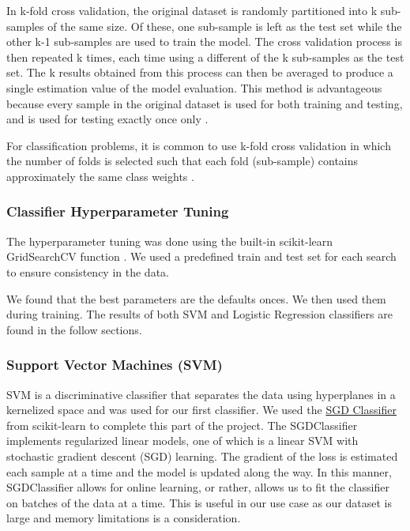 \documentclass[12pt]{article}
\begin{document}
In k-fold cross validation, the original dataset is randomly partitioned into k sub-samples of the same size. Of these, one sub-sample is left as the test set while the other k-1 sub-samples are used to train the model. The cross validation process is then repeated k times, each time using a different of the k sub-samples as the test set. The k results obtained from this process can then be averaged to produce a single estimation value of the model evaluation. This method is advantageous because every sample in the original dataset is used for both training and testing, and is used for testing exactly once only \cite{k_fold1}.

For classification problems, it is common to use k-fold cross validation in which the number of folds is selected such that each fold (sub-sample) contains approximately the same class weights \cite{k_fold2}.

\subsubsection{Classifier Hyperparameter Tuning}

The hyperparameter tuning was done using the built-in scikit-learn GridSearchCV  function \cite{sklearn}. We used a predefined train and test set for each search to ensure consistency in the data. 

We found that the best parameters are the defaults onces. We then used them during training. The results of both SVM and Logistic Regression classifiers are found in the follow sections. 

\subsubsection{Support Vector Machines (SVM)}
 
SVM is a discriminative classifier that separates the data using hyperplanes in a kernelized space and was used for our first classifier. We used the \href{https://scikit-learn.org/stable/modules/generated/sklearn.linear_model.SGDClassifier.html}{SGD Classifier} from scikit-learn \cite{sklearn} to complete this part of the project. The SGDClassifier implements regularized linear models, one of which is a linear SVM with stochastic gradient descent (SGD) learning. The gradient of the loss is estimated each sample at a time and the model is updated along the way. In this manner, SGDClassifier allows for online learning, or rather, allows us to fit the classifier on batches of the data at a time. This is useful in our use case as our dataset is large and memory limitations is a consideration. \\
\end{document}
